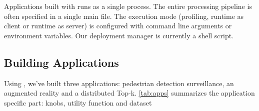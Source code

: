 



Applications built with \sysname{} runs as a single process. The entire
processing pipeline is often specified in a single main file. The execution mode
(profiling, runtime as client or runtime as server) is configured with command
line arguments or environment variables. Our deployment manager is currently a
shell script.

\subsection{Building \sysname{} Applications}
\label{sec:build-appl}

Using \sysname{}, we've built three applications: pedestrian detection
surveillance, an augmented reality and a distributed Top-k. \autoref{tab:apps}
summarizes the application specific part: knobs, utility function and dataset


